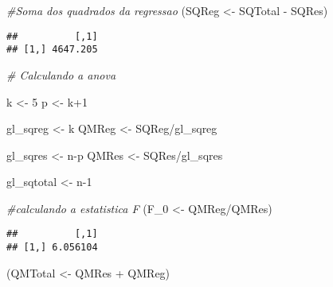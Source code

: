 \documentclass[
]{article}
\newenvironment{Shaded}{\begin{snugshade}}{\end{snugshade}}
\newcommand{\CommentTok}[1]{\textcolor[rgb]{0.56,0.35,0.01}{\textit{#1}}}
\newcommand{\DecValTok}[1]{\textcolor[rgb]{0.00,0.00,0.81}{#1}}
\newcommand{\NormalTok}[1]{#1}
\newcommand{\OtherTok}[1]{\textcolor[rgb]{0.56,0.35,0.01}{#1}}
\newcommand{\SpecialCharTok}[1]{\textcolor[rgb]{0.00,0.00,0.00}{#1}}
\begin{document}
\begin{Shaded}
\begin{Highlighting}[]
\CommentTok{\#Soma dos quadrados da regressao  }
\NormalTok{(SQReg }\OtherTok{\textless{}{-}}\NormalTok{ SQTotal }\SpecialCharTok{{-}}\NormalTok{ SQRes)}
\end{Highlighting}
\end{Shaded}

\begin{verbatim}
##          [,1]
## [1,] 4647.205
\end{verbatim}

\begin{Shaded}
\begin{Highlighting}[]
\CommentTok{\# Calculando a anova}

\NormalTok{k }\OtherTok{\textless{}{-}} \DecValTok{5} 
\NormalTok{p }\OtherTok{\textless{}{-}}\NormalTok{ k}\SpecialCharTok{+}\DecValTok{1}


\NormalTok{gl\_sqreg }\OtherTok{\textless{}{-}}\NormalTok{ k}
\NormalTok{QMReg }\OtherTok{\textless{}{-}}\NormalTok{ SQReg}\SpecialCharTok{/}\NormalTok{gl\_sqreg}

\NormalTok{gl\_sqres }\OtherTok{\textless{}{-}}\NormalTok{ n}\SpecialCharTok{{-}}\NormalTok{p}
\NormalTok{QMRes }\OtherTok{\textless{}{-}}\NormalTok{ SQRes}\SpecialCharTok{/}\NormalTok{gl\_sqres}

\NormalTok{gl\_sqtotal }\OtherTok{\textless{}{-}}\NormalTok{ n}\DecValTok{{-}1}
\end{Highlighting}
\end{Shaded}

\begin{Shaded}
\begin{Highlighting}[]
\CommentTok{\#calculando a estatistica F}
\NormalTok{(F\_0 }\OtherTok{\textless{}{-}}\NormalTok{ QMReg}\SpecialCharTok{/}\NormalTok{QMRes)}
\end{Highlighting}
\end{Shaded}

\begin{verbatim}
##          [,1]
## [1,] 6.056104
\end{verbatim}

\begin{Shaded}
\begin{Highlighting}[]
\NormalTok{(QMTotal }\OtherTok{\textless{}{-}}\NormalTok{ QMRes }\SpecialCharTok{+}\NormalTok{ QMReg)}
\end{Highlighting}
\end{Shaded}
\end{document}
